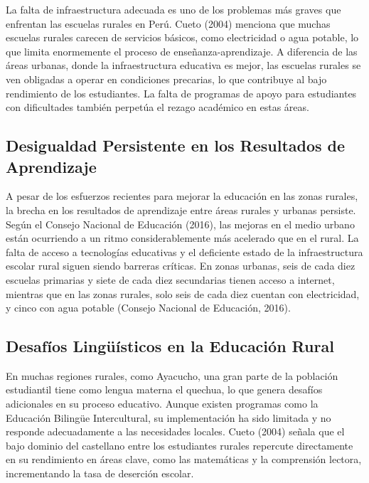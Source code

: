 \documentclass[
]{article}
\begin{document}
\vspace{0.5cm}

La falta de infraestructura adecuada es uno de los problemas más graves
que enfrentan las escuelas rurales en Perú. Cueto (2004) menciona que
muchas escuelas rurales carecen de servicios básicos, como electricidad
o agua potable, lo que limita enormemente el proceso de
enseñanza-aprendizaje. A diferencia de las áreas urbanas, donde la
infraestructura educativa es mejor, las escuelas rurales se ven
obligadas a operar en condiciones precarias, lo que contribuye al bajo
rendimiento de los estudiantes. La falta de programas de apoyo para
estudiantes con dificultades también perpetúa el rezago académico en
estas áreas.

\subsection*{Desigualdad Persistente en los Resultados de
Aprendizaje}\label{desigualdad-persistente-en-los-resultados-de-aprendizaje}

\vspace{0.5cm}

A pesar de los esfuerzos recientes para mejorar la educación en las
zonas rurales, la brecha en los resultados de aprendizaje entre áreas
rurales y urbanas persiste. Según el Consejo Nacional de Educación
(2016), las mejoras en el medio urbano están ocurriendo a un ritmo
considerablemente más acelerado que en el rural. La falta de acceso a
tecnologías educativas y el deficiente estado de la infraestructura
escolar rural siguen siendo barreras críticas. En zonas urbanas, seis de
cada diez escuelas primarias y siete de cada diez secundarias tienen
acceso a internet, mientras que en las zonas rurales, solo seis de cada
diez cuentan con electricidad, y cinco con agua potable (Consejo
Nacional de Educación, 2016).

\subsection*{Desafíos Lingüísticos en la Educación
Rural}\label{desafuxedos-linguxfcuxedsticos-en-la-educaciuxf3n-rural}

\vspace{0.5cm}

En muchas regiones rurales, como Ayacucho, una gran parte de la
población estudiantil tiene como lengua materna el quechua, lo que
genera desafíos adicionales en su proceso educativo. Aunque existen
programas como la Educación Bilingüe Intercultural, su implementación ha
sido limitada y no responde adecuadamente a las necesidades locales.
Cueto (2004) señala que el bajo dominio del castellano entre los
estudiantes rurales repercute directamente en su rendimiento en áreas
clave, como las matemáticas y la comprensión lectora, incrementando la
tasa de deserción escolar.
\end{document}
